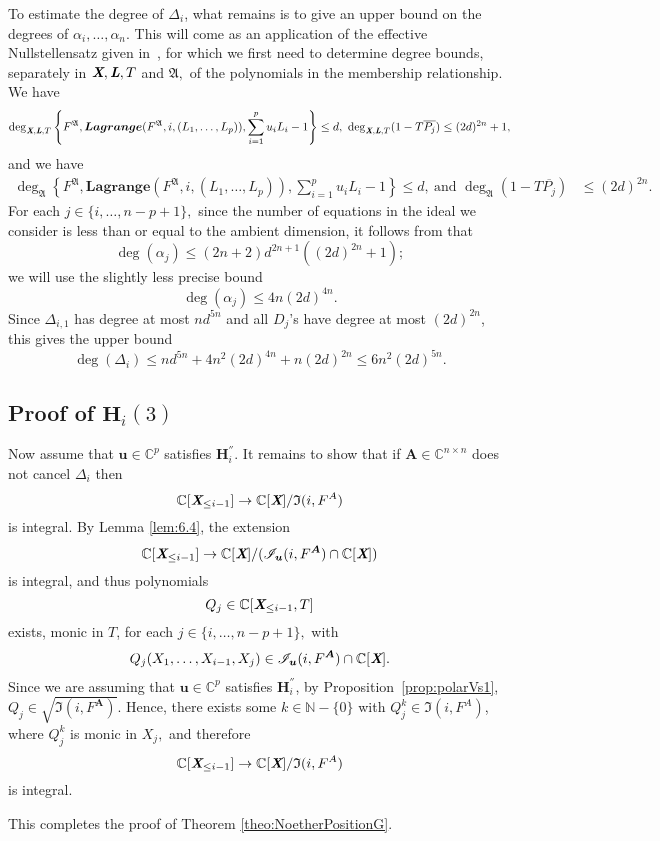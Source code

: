 \documentclass[a4paper]{article}
\def\A{\mathfrak{A}}
\def\Lb{\textit{\textbf{L}}}
\def\Xb{\textit{\textbf{X}}}
\def\mA{{\bm A}}
\def\ub{{\bm u}}
\def\pjb{\overline{P_{j}}}
\def\D{\Delta}
\def\C{\mathbb{C}}
\def\IiA{\mathfrak{I}(i,F^A)}
\def\IiAr{\sqrt{\mathfrak{I}(i,F^{\mA})}}
\def\lagFfA{{\bm{Lagrange}}(F^{\A},i,(L_1,\hdots,L_p))}
\def\IilA{\mathscr{I}_{\ub}(i,F^{\mA})}
\def\udl{\sum_{i=1}^pu_iL_i}
\begin{document}
\noindent
To estimate the degree of $\D_{i}$, what remains is to give an upper
bound on the degrees of $\alpha_i,\dots,\alpha_n$. This will come as an
application of the effective Nullstellensatz given in~\cite{EN}, for
which we first need to determine degree bounds, separately in $\Xb,\Lb,T$
and $\A,$ of the polynomials in the membership relationship. We have
\begin{align*}
\deg_{\Xb,\Lb,T}
\left\{ 
F^{\A},\lagFfA, \udl-1
\right\}
\leq d, ~
\deg_{\Xb,\Lb,T}(1-T\pjb) \leq (2d)^{2n} +1, 
\end{align*}
and we have 
\begin{align*}
\deg_{\A}  
\left\{ 
F^{\A},\lagFfA, \udl-1
\right\} 
\leq d,~\textrm{and }
\deg_{\A}(1-T\pjb)& \leq (2d)^{2n}.
\end{align*}
For each $j \in \{i,\hdots,n-p+1\},$ since  the number of equations in the ideal we consider is less than or equal to the ambient dimension, it follows from \cite[Theorem 0.5]{EN} that  
\[
\deg(\alpha_j) \le (2n+2)d^{2n+1}((2d)^{2n}+1);
\]
we will use
the slightly less precise bound \[\deg(\alpha_j) \le 4n(2d)^{4n}.\] Since $\D_{i,1}$ has degree at most
$nd^{5n}$ and all $D_j$'s have degree at most $(2d)^{2n}$, this gives
the upper bound
$$\deg(\D_i) \le nd^{5n} +  4n^2(2d)^{4n} + n(2d)^{2n} \leq 6n^2(2d)^{5n}.$$


\subsection{Proof of $\textbf{H}_i(3)$}
Now assume that $\ub \in \C^p$ satisfies $\bm H_i^{''}$. It remains to show that if $\mA \in \C^{n\times n}$ does not cancel $\D_{i}$ then
\[
 \C[\Xb_{\leq i-1}]\rightarrow \C[\Xb]/\IiA
\]
is integral. 
\noindent
By Lemma \ref{lem:6.4}, the extension
\[
 \C[\Xb_{\leq i-1}]\rightarrow \C[\Xb]/(\IilA \cap \C[\Xb])
\]
is integral, and thus polynomials 
\[
Q_j \in \C[\Xb_{\leq i-1},T]
\]
exists, monic in $T$, for each $j \in \{i,\hdots,n-p+1\},$ with
\begin{align*}
Q_j(X_1,\hdots,X_{i-1},X_j) \in \IilA \cap \C[\Xb].
\end{align*}
%
Since we are assuming that $\ub \in \C^p$ satisfies $\bm H_i^{''}$, by Proposition~\ref{prop:polarVs1}, $Q_j \in \IiAr.$ Hence, there exists some $k \in \mathbb{N}-\{0\}$ with $Q_j^{k} \in\IiA$, where $Q_j^k$ is monic in $X_j,$ and therefore
\[
 \C[\Xb_{\leq i-1}]\rightarrow \C[\Xb]/\IiA
\]
is integral.
\par 
This completes the proof of Theorem \ref{theo:NoetherPositionG}.
\end{document}
